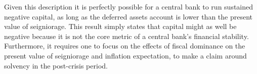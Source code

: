 \documentclass[american]{scrartcl}
\begin{document}
Given this description it is perfectly possible for a central bank to run sustained negative capital, as long as the deferred assets account is lower than the present value of seigniorage. This result simply states that capital might as well be negative because it is not the core metric of a central bank's financial stability. Furthermore, it requires one to focus on the effects of fiscal dominance on the present value of seigniorage and inflation expectation, to make a claim around solvency in the post-crisis period. %



\newpage
\nocite{*}
\printbibliography
\end{document}
